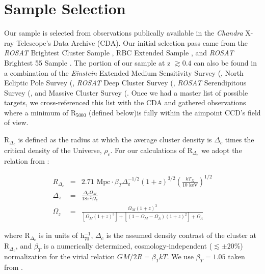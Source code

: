 \documentclass{emulateapj}
\begin{document}
\section{Sample Selection} \label{sec:selection}


Our sample is selected from observations publically available in the
{\textit{Chandra}} X-ray
Telescope's Data Archive (CDA). Our initial selection pass came from the
{\textit{ROSAT}} Brightest Cluster Sample
\citep{1998MNRAS.301..881E}, RBC Extended Sample 
\citep{2000MNRAS.318..333E}, and {\textit{ROSAT}} Brightest 55 Sample
\citep{1990MNRAS.245..559E, 1998MNRAS.298..416P}. The
portion of our sample at z $\gtrsim 0.4$ can also be found in a
combination of the {\textit{Einstein}} Extended Medium Sensitivity Survey
(\citep{1990ApJS...72..567G}, North Ecliptic Pole Survey
(\citep{2006ApJS..162..304H}, {\textit{ROSAT}} Deep Cluster Survey
(\citep{1995ApJ...445L..11R}, {\textit{ROSAT}} Serendipitous Survey
(\citep{1998ApJ...502..558V}, and Massive Cluster Survey
(\citep{2001ApJ...553..668E}. Once we had a master list of possible
targets, we cross-referenced this list with the CDA and gathered
observations where a minimum of R$_{5000}$ (defined below)is fully
within the aimpoint CCD's field of view.

R$_{\Delta_c}$ is defined as the radius at which the
average cluster density is $\Delta_c$ times the critical density of the
Universe, $\rho_c$. For our calculations of R$_{\Delta_c}$ we adopt the
relation from \cite{2002A&A...389....1A}:

\begin{eqnarray}
R_{\Delta_c} &=& 2.71 \text{ Mpc}
\cdot \beta_T
\Delta_{\text{z}}^{-1/2}
(1+z)^{3/2}
(\frac{kT_X}{10 \text{ keV}})^{1/2}\\
\Delta_z &=& \frac{\Delta_c \Omega_M}{18\pi^2\Omega_z} \nonumber \\
\Omega_z &=& \frac{\Omega_M (1+z)^3}{[\Omega_M
(1+z)^3]+[(1-\Omega_M-\Omega_{\Lambda})(1+z)^2]+\Omega_{\Lambda}} \nonumber
\end{eqnarray}

where R$_{\Delta_c}$ is in units of h$_{70}^{-1}$, $\Delta_c$ is
the assumed density contrast of the cluster at R$_{\Delta_c}$, and
$\beta_T$ is a numerically determined, cosmology-independent
($\lesssim \pm 20\%$) normalization for the virial relation $GM/2R =
\beta_TkT$. We use $\beta_T = 1.05$ taken from
\cite{1996ApJ...469..494E}.
\end{document}
